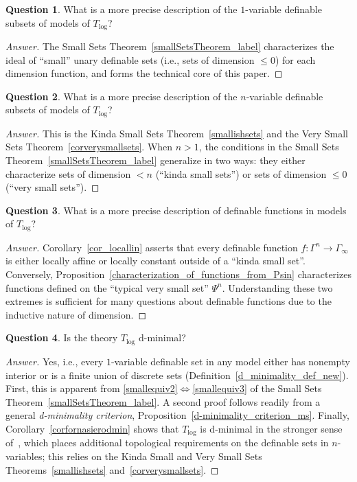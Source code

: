 \documentclass[11pt]{amsart}
\theoremstyle{plain}
\theoremstyle{definition}
\newtheorem*{question*}{Question}
\numberwithin{equation}{section}
\newcommand\0{\varnothing}
\begin{document}
\begin{question*}
What is a more precise description of the $1$-variable definable subsets of models of $T_{\log}$?
\end{question*}
\begin{proof}[Answer]\renewcommand{\qedsymbol}{}
The Small Sets Theorem~\ref{smallSetsTheorem_label} characterizes the ideal of ``small'' unary definable sets (i.e., sets of dimension $\leq 0$) for each dimension function, and forms the technical core of this paper.
\end{proof}

\begin{question*}
What is a more precise description of the $n$-variable definable subsets of models of $T_{\log}$? 
\end{question*}
\begin{proof}[Answer]\renewcommand{\qedsymbol}{}
This is the Kinda Small Sets Theorem~\ref{smallishsets} and the Very Small Sets Theorem~\ref{corverysmallsets}. When $n>1$, the conditions in the Small Sets Theorem~\ref{smallSetsTheorem_label} generalize in two ways: they either characterize sets of dimension $<n$ (``kinda small sets'') or sets of dimension $\leq 0$ (``very small sets'').
\end{proof}

\begin{question*}
What is a more precise description of definable functions in models of $T_{\log}$?
\end{question*}
\begin{proof}[Answer]\renewcommand{\qedsymbol}{}
Corollary~\ref{cor_locallin} asserts that every definable function $f\colon\Gamma^n\to\Gamma_{\infty}$ is either locally affine or locally constant outside of a ``kinda small set''.
Conversely, Proposition~\ref{characterization_of_functions_from_Psin} characterizes functions defined on the ``typical very small set'' $\Psi^n$. Understanding these two extremes is sufficient for many questions about definable functions due to the inductive nature of dimension.
\end{proof}

\begin{question*}
Is the theory $T_{\log}$ d-minimal?
\end{question*}
\begin{proof}[Answer]\renewcommand{\qedsymbol}{}
Yes, i.e., every $1$-variable definable set in any model either has nonempty interior or is a finite union of discrete sets (Definition~\ref{d_minimality_def_new}). First, this is apparent from \eqref{smallequiv2}$\Leftrightarrow$\eqref{smallequiv3} of the Small Sets Theorem~\ref{smallSetsTheorem_label}. A second proof follows readily from a general \emph{d-minimality criterion}, Proposition~\ref{d-minimality_criterion_ms}. Finally, Corollary~\ref{corfornasierodmin} shows that $T_{\log}$ is d-minimal in the stronger sense of~\cite[Definition 9.1]{fornasiero-dimmatroiddense}, which places additional topological requirements on the definable sets in $n$-variables; this relies on the Kinda Small and Very Small Sets Theorems~\ref{smallishsets} and~\ref{corverysmallsets}. 
\end{proof}
\end{document}
